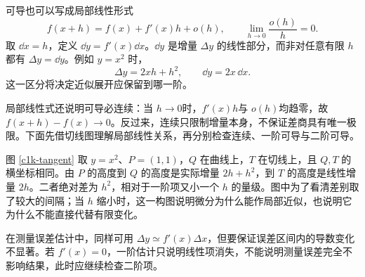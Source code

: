 可导也可以写成局部线性形式
\[
 f(x+h)=f(x)+f'(x)h+o(h),\qquad
 \lim_{h\to0}\frac{o(h)}h=0.
\]
取 $\dd x=h$，定义 $\dd y=f'(x)\dd x$。$\dd y$ 是增量 $\Delta y$ 的线性部分，而非对任意有限 $h$ 都有 $\Delta y=\dd y$。例如 $y=x^2$ 时，
\[
 \Delta y=2x h+h^2,\qquad \dd y=2x\,\dd x.
\]
这一区分将决定近似展开应保留到哪一阶。

局部线性式还说明可导必连续：当 $h\to0$时，$f'(x)h$与 $o(h)$均趋零，故 $f(x+h)-f(x)\to0$。反过来，连续只限制增量本身，不保证差商具有唯一极限。下面先借切线图理解局部线性关系，再分别检查连续、一阶可导与二阶可导。

图 \ref{c1k-tangent} 取 $y=x^2$、$P=(1,1)$，$Q$ 在曲线上，$T$ 在切线上，且 $Q,T$ 的横坐标相同。由 $P$ 的高度到 $Q$ 的高度是实际增量 $2h+h^2$，到 $T$ 的高度是线性增量 $2h$。二者绝对差为 $h^2$，相对于一阶项又小一个 $h$ 的量级。图中为了看清差别取了较大的间隔；当 $h$ 缩小时，这一构图说明微分为什么能作局部近似，也说明它为什么不能直接代替有限变化。

在测量误差估计中，同样可用 $\Delta y\simeq f'(x)\Delta x$，但要保证误差区间内的导数变化不显著。若 $f'(x)=0$，一阶估计只说明线性项消失，不能说明测量误差完全不影响结果，此时应继续检查二阶项。


